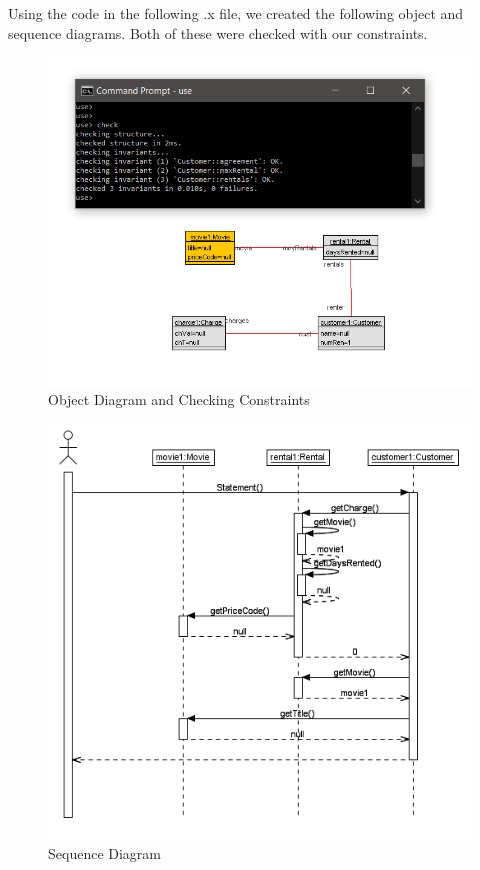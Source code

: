 \documentclass{article}
\begin{document}
	\noindent
	Using the code in the following .x file, we created the following object and sequence diagrams. Both of these were checked with our constraints.
%
	\begin{figure}[h]
		\includegraphics[width=\linewidth]{Q1ObjPNG.PNG}
		\caption{Object Diagram and Checking Constraints}
		\label{fig:q1obj}
	\end{figure}
	\newpage
	\begin{figure}[h]
		\includegraphics[width=\linewidth]{Q1Sequence.PNG}
		\caption{Sequence Diagram}
		\label{fig:q1seq}
	\end{figure}
\end{document}

